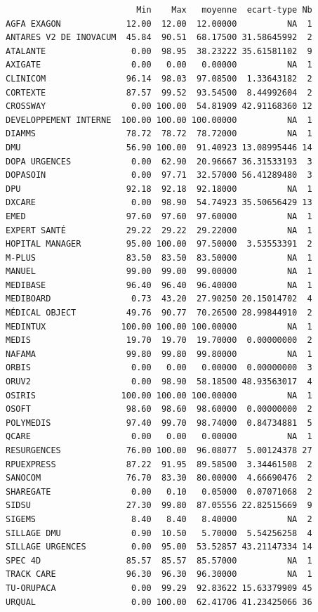\documentclass[]{article}
\begin{document}
\begin{verbatim}
                          Min    Max   moyenne  ecart-type Nb
AGFA EXAGON             12.00  12.00  12.00000          NA  1
ANTARES V2 DE INOVACUM  45.84  90.51  68.17500 31.58645992  2
ATALANTE                 0.00  98.95  38.23222 35.61581102  9
AXIGATE                  0.00   0.00   0.00000          NA  1
CLINICOM                96.14  98.03  97.08500  1.33643182  2
CORTEXTE                87.57  99.52  93.54500  8.44992604  2
CROSSWAY                 0.00 100.00  54.81909 42.91168360 12
DEVELOPPEMENT INTERNE  100.00 100.00 100.00000          NA  1
DIAMMS                  78.72  78.72  78.72000          NA  1
DMU                     56.90 100.00  91.40923 13.08995446 14
DOPA URGENCES            0.00  62.90  20.96667 36.31533193  3
DOPASOIN                 0.00  97.71  32.57000 56.41289480  3
DPU                     92.18  92.18  92.18000          NA  1
DXCARE                   0.00  98.90  54.74923 35.50656429 13
EMED                    97.60  97.60  97.60000          NA  1
EXPERT SANTÉ            29.22  29.22  29.22000          NA  1
HOPITAL MANAGER         95.00 100.00  97.50000  3.53553391  2
M-PLUS                  83.50  83.50  83.50000          NA  1
MANUEL                  99.00  99.00  99.00000          NA  1
MEDIBASE                96.40  96.40  96.40000          NA  1
MEDIBOARD                0.73  43.20  27.90250 20.15014702  4
MÉDICAL OBJECT          49.76  90.77  70.26500 28.99844910  2
MEDINTUX               100.00 100.00 100.00000          NA  1
MEDIS                   19.70  19.70  19.70000  0.00000000  2
NAFAMA                  99.80  99.80  99.80000          NA  1
ORBIS                    0.00   0.00   0.00000  0.00000000  3
ORUV2                    0.00  98.90  58.18500 48.93563017  4
OSIRIS                 100.00 100.00 100.00000          NA  1
OSOFT                   98.60  98.60  98.60000  0.00000000  2
POLYMEDIS               97.40  99.70  98.74000  0.84734881  5
QCARE                    0.00   0.00   0.00000          NA  1
RESURGENCES             76.00 100.00  96.08077  5.00124378 27
RPUEXPRESS              87.22  91.95  89.58500  3.34461508  2
SANOCOM                 76.70  83.30  80.00000  4.66690476  2
SHAREGATE                0.00   0.10   0.05000  0.07071068  2
SIDSU                   27.30  99.80  87.05556 22.82515669  9
SIGEMS                   8.40   8.40   8.40000          NA  2
SILLAGE DMU              0.90  10.50   5.70000  5.54256258  4
SILLAGE URGENCES         0.00  95.00  53.52857 43.21147334 14
SPEC 4D                 85.57  85.57  85.57000          NA  1
TRACK CARE              96.30  96.30  96.30000          NA  1
TU-ORUPACA               0.00  99.29  92.83622 15.63379909 45
URQUAL                   0.00 100.00  62.41706 41.23425066 36
\end{verbatim}
\end{document}
